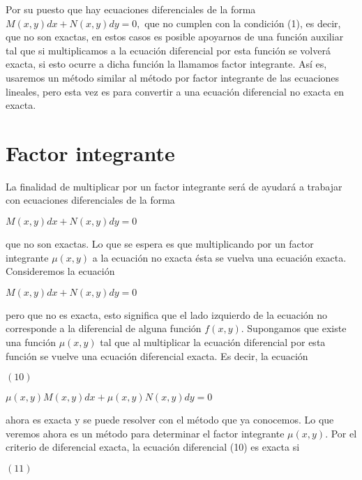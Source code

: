 \documentclass[l etterpaper,11pt]{article}
\begin{document}
Por su puesto que hay ecuaciones diferenciales de la forma $ M(x,y)dx+N(x,y)dy=0 ,$ que no cumplen con la condición (1), es decir, que no son exactas, en estos casos es posible apoyarnos de una función auxiliar tal que si multiplicamos a la ecuación diferencial por esta función se volverá exacta, si esto ocurre a dicha función la llamamos factor integrante. Así es, usaremos un método similar al método por factor integrante de las ecuaciones lineales, pero esta vez es para convertir a una ecuación diferencial no exacta en exacta.


{\section{Factor integrante }}

La finalidad de multiplicar por un factor integrante será de ayudará a trabajar con ecuaciones diferenciales de la forma
\begin{center}

$M(x,y)dx+N(x,y)dy=0$\\
\end{center}

que no son exactas. Lo que se espera es que multiplicando por un factor integrante $ \mu(x,y) $  a la ecuación no exacta ésta se vuelva una ecuación exacta.
Consideremos la ecuación
\begin{center}

$M(x,y)dx+N(x,y)dy=0$\\
\end{center}

pero que no es exacta, esto significa que el lado izquierdo de la ecuación no corresponde a la diferencial de alguna función $ f(x,y). $ Supongamos que existe una función $ \mu(x,y) $ tal que al multiplicar la ecuación diferencial por esta función se vuelve una ecuación diferencial exacta. Es decir, la ecuación
\begin{flushleft} 
$(10)$
\end{flushleft}

\begin{center}

$\mu(x,y)M(x,y)dx+\mu(x,y)N(x,y)dy=0$\\
\end{center}

ahora es exacta y se puede resolver con el método que ya conocemos. Lo que veremos ahora es un método para determinar el factor integrante $ \mu(x,y). $
Por el criterio de diferencial exacta, la ecuación diferencial (10) es exacta si
\begin{flushleft} 
$(11)$
\end{flushleft}
\end{document}
